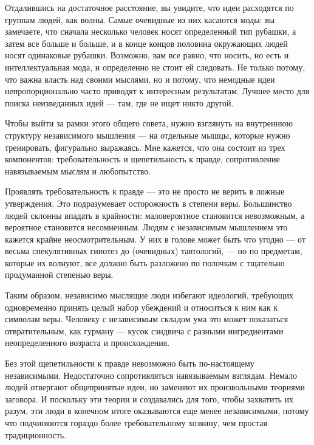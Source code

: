 \documentclass[ebook,12pt,oneside,openany]{memoir}
\begin{document}
Отдалившись на достаточное расстояние, вы увидите, что идеи расходятся
по группам людей, как волны. Самые очевидные из них касаются моды: вы
замечаете, что сначала несколько человек носят определенный тип
рубашки, а затем все больше и больше, и в конце концов половина
окружающих людей носят одинаковые рубашки. Возможно, вам все равно,
что носить, но есть и интеллектуальная мода, и определенно не стоит ей
следовать. Не только потому, что важна власть над своими мыслями, но и
потому, что немодные идеи непропорционально часто приводят к
интересным результатам. Лучшее место для поиска неизведанных идей —
там, где не ищет никто другой. \newline

Чтобы выйти за рамки этого общего совета, нужно взглянуть на
внутреннюю структуру независимого мышления — на отдельные мышцы,
которые нужно тренировать, фигурально выражаясь. Мне кажется, что она
состоит из трех компонентов: требовательность и щепетильность к
правде, сопротивление навязываемым мыслям и любопытство. \newline

Проявлять требовательность к правде — это не просто не верить в ложные
утверждения. Это подразумевает осторожность в степени веры.
Большинство людей склонны впадать в крайности: маловероятное
становится невозможным, а вероятное становится несомненным. Людям с
независимым мышлением это кажется крайне неосмотрительным. У них в
голове может быть что угодно — от весьма спекулятивных гипотез до
(очевидных) тавтологий, — но по предметам, которые их волнуют, все
должно быть разложено по полочкам с тщательно продуманной степенью
веры. \newline

Таким образом, независимо мыслящие люди избегают идеологий, требующих
одновременно принять целый набор убеждений и относиться к ним как к
символам веры. Человеку с независимым складом ума это может показаться
отвратительным, как гурману — кусок сэндвича с разными ингредиентами
неопределенного возраста и происхождения. \newline

Без этой щепетильности к правде невозможно быть по-настоящему
независимыми. Недостаточно сопротивляться навязываемым взглядам.
Немало людей отвергают общепринятые идеи, но заменяют их произвольными
теориями заговора. И поскольку эти теории и создавались для того,
чтобы захватить их разум, эти люди в конечном итоге оказываются еще
менее независимыми, потому что подчиняются гораздо более
требовательному хозяину, чем простая традиционность. \newline
\end{document}
